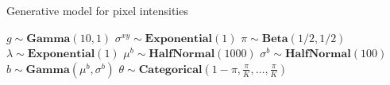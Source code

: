 \algrenewcommand{}
\begin{algorithm}
\caption{Generative model for pixel intensities}
\label{alg:pseudocode}
\begin{algorithmic}[1]
\State $g \sim \mathbf{Gamma}(10, 1)$
\State $\sigma^{xy} \sim \mathbf{Exponential}(1)$
\State $\pi \sim \mathbf{Beta}(1/2, 1/2)$
\State $\lambda \sim \mathbf{Exponential}(1)$
    \State $\mu^b \sim \mathbf{HalfNormal}(1000)$
    \State $\sigma^b \sim \mathbf{HalfNormal}(100)$
        \State $b \sim \mathbf{Gamma}(\mu^b, \sigma^b)$
        \State $\theta \sim \mathbf{Categorical}\left(1 - \pi, \frac{\pi}{K}, \dots, \frac{\pi}{K}\right)$
        

\end{algorithmic}
\end{algorithm}

